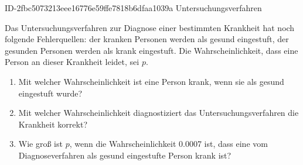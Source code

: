 \begin{exercise}
      {ID-2fbc5073213eee16776e59ffe7818b6dfaa1039a}
      {Untersuchungsverfahren}
  \ifproblem\problem\par
    Das Untersuchungsverfahren zur Diagnose einer bestimmten Krankheit hat
    noch folgende Fehlerquellen:  der kranken Personen werden als
    gesund eingestuft,  der gesunden Personen werden als krank eingestuft.
    Die Wahrscheinlichkeit, dass eine Person an dieser Krankheit leidet, sei $p$.
    \begin{enumerate}
      \item Mit welcher Wahrscheinlichkeit ist eine Person krank,
            wenn sie als gesund eingestuft wurde?
      \item Mit welcher Wahrscheinlichkeit diagnostiziert das Untersuchungsverfahren
            die Krankheit korrekt?
      \item Wie groß ist $p$, wenn die Wahrscheinlichkeit \num{0.0007} ist, dass
            eine vom Diagnoseverfahren als gesund eingestufte Person krank ist?
    \end{enumerate}
  \fi
\end{exercise}
